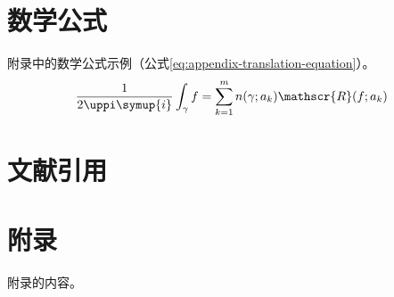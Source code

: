 \begin{translation}
\section{数学公式}

附录中的数学公式示例（公式\eqref{eq:appendix-translation-equation}）。
\begin{equation}
  \frac{1}{2 \uppi \symup{i}} \int_\gamma f = \sum_{k=1}^m n(\gamma; a_k) \mathscr{R}(f; a_k)
  \label{eq:appendix-translation-equation}
\end{equation}


\section{文献引用}



\appendix

\section{附录}

附录的内容。



% 

\printbibliography

%   

\end{translation}
